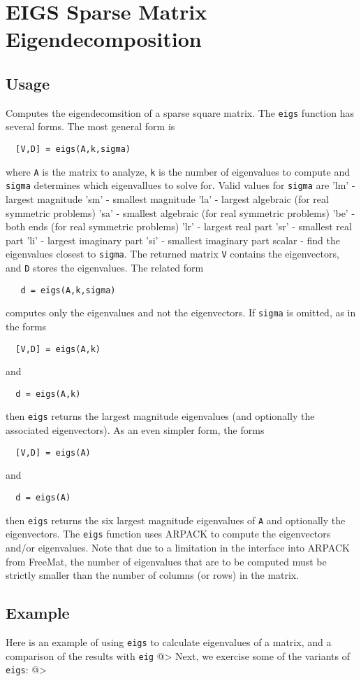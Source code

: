 \section{EIGS Sparse Matrix Eigendecomposition}

\subsection{Usage}

Computes the eigendecomsition of a sparse square matrix.  The
\verb|eigs| function has several forms.  The most general form is
\begin{verbatim}
  [V,D] = eigs(A,k,sigma)
\end{verbatim}
where \verb|A| is the matrix to analyze, \verb|k| is the number of
eigenvalues to compute and \verb|sigma| determines which eigenvallues
to solve for.  Valid values for \verb|sigma| are
   'lm' - largest magnitude 
   'sm' - smallest magnitude
   'la' - largest algebraic (for real symmetric problems)
   'sa' - smallest algebraic (for real symmetric problems)
   'be' - both ends (for real symmetric problems)
   'lr' - largest real part 
   'sr' - smallest real part
   'li' - largest imaginary part
   'si' - smallest imaginary part
 scalar - find the eigenvalues closest to \verb|sigma|.
The returned matrix \verb|V| contains the eigenvectors, and \verb|D|
stores the eigenvalues.  The related form
\begin{verbatim}
   d = eigs(A,k,sigma)
\end{verbatim}
computes only the eigenvalues and not the eigenvectors.  If \verb|sigma|
is omitted, as in the forms
\begin{verbatim}
  [V,D] = eigs(A,k)
\end{verbatim}
and
\begin{verbatim}
  d = eigs(A,k)
\end{verbatim}
then \verb|eigs| returns the largest magnitude eigenvalues (and optionally
the associated eigenvectors).  As an even simpler form, the forms
\begin{verbatim}
  [V,D] = eigs(A)
\end{verbatim}
and
\begin{verbatim}
  d = eigs(A)
\end{verbatim}
then \verb|eigs| returns the six largest magnitude eigenvalues of \verb|A| and
optionally the eigenvectors.  The \verb|eigs| function uses ARPACK to
compute the eigenvectors and/or eigenvalues.  Note that due to a 
limitation in the interface into ARPACK from FreeMat, the number of
eigenvalues that are to be computed must be strictly smaller than the
number of columns (or rows) in the matrix.
\subsection{Example}

Here is an example of using \verb|eigs| to calculate eigenvalues
of a matrix, and a comparison of the results with \verb|eig|
@>
Next, we exercise some of the variants of \verb|eigs|:
@>
